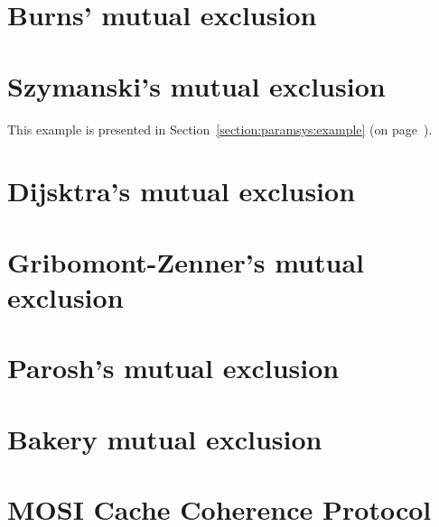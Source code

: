 \label{chapter:case:studies}
\label{chapter:experimentation}


\section{Burns' mutual exclusion}
\ifnoexperiments\else\fi

\section{Szymanski's mutual exclusion}
This example is presented in Section~\ref{section:paramsys:example}
(on page~\pageref{section:paramsys:example}).

\section{Dijsktra's mutual exclusion}
\ifnoexperiments\else\fi

\newpage
\section{Gribomont-Zenner's mutual exclusion}
\ifnoexperiments\else\fi

\section{Parosh's mutual exclusion}
\ifnoexperiments\else\fi

\section{Bakery mutual exclusion}
\ifnoexperiments\else\fi


\section{MOSI Cache Coherence Protocol}
\ifnoexperiments\else\fi
